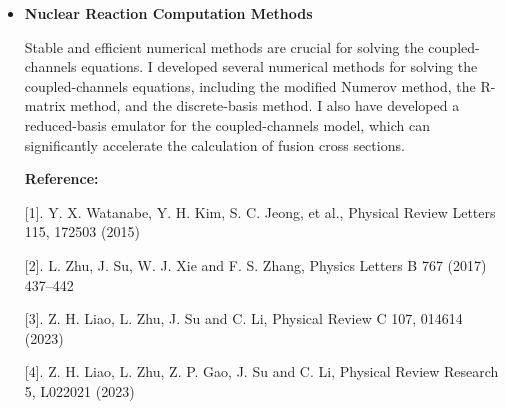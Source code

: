\documentclass[10pt]{article}
\begin{document}
\begin{itemize}[leftmargin=1.2em,itemsep=4pt,topsep=2pt,label={\color{accent}$\blacktriangleright$}]
It has been well recognized that many nuclei are deformed in the ground state. Such nuclear deformation plays an important role in low-energy heavy-ion fusion reactions. For instance, the static deformation of nuclei strongly affects experimental observables such as fusion cross sections. Using this property, nuclear deformation parameters can be extracted by comparing experimental data with theoretical calculations based on the coupled-channels model, which is a quantum mechanical reaction theory for multi-channel problems [6]. However, traditional coupled-channels calculations require extensive computations when many parameters are involved. To address this problem, I successfully constructed a Coupled-Channels emulator based on the Reduced Basis method (Eigenvector Continuation). This approach significantly accelerates the calculation while maintaining high accuracy [7]. Applying this method to heavy-ion fusion reactions for systems such as \textsuperscript{16}O +  \textsuperscript{144,154}Sm and \textsuperscript{16}O + \textsuperscript{186}W, I successfully extracted the nuclear deformation parameters of the target nuclei. This work has provided an efficient theoretical tool for systematically exploring intrinsic nuclear shapes through nuclear reactions [8, 9]. This work was carried out with my host Prof. Kouichi Hagino during my stay at Kyoto University in 2025.

\item \textbf{Nuclear Reaction Computation Methods} 

Stable and efficient numerical methods are crucial for solving the coupled-channels equations. I developed several numerical methods for solving the coupled-channels equations, including the modified Numerov method, the R-matrix method, and the discrete-basis method. I also have developed a reduced-basis emulator for the coupled-channels model, which can significantly accelerate the calculation of fusion cross sections. 

\textbf{Reference:}

[1]. Y. X. Watanabe, Y. H. Kim, S. C. Jeong, et al., Physical Review Letters 115, 172503 (2015)

[2]. L. Zhu, J. Su, W. J. Xie and F. S. Zhang, Physics Letters B 767 (2017) 437–442

[3]. Z. H. Liao, L. Zhu, J. Su and C. Li, Physical Review C 107, 014614 (2023)

[4]. Z. H. Liao, L. Zhu, Z. P. Gao, J. Su and C. Li, Physical Review Research 5, L022021 (2023)


\end{itemize}
\end{document}
